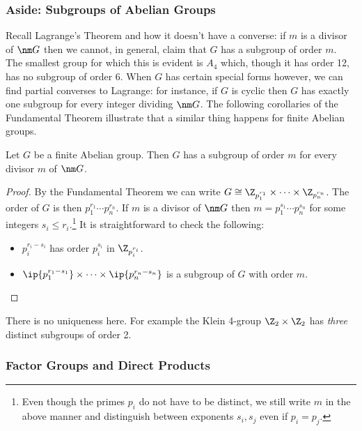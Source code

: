 
\begin{aside}
\vspace{-13pt}
\subsubsection*{Aside: Subgroups of Abelian Groups}

Recall Lagrange's Theorem and how it doesn't have a converse: if $m$ is a divisor of $\nm G$ then we cannot, in general, claim that $G$ has a subgroup of order $m$. The smallest group for which this is evident is $A_4$ which, though it has order 12, has no subgroup of order 6. When $G$ has certain special forms however, we can find partial converses to Lagrange: for instance, if $G$ is cyclic then $G$ has exactly one subgroup for every integer dividing $\nm G$. The following corollaries of the Fundamental Theorem illustrate that a similar thing happens for finite Abelian groups.

\begin{cor}\label{thm:abelsub}
Let $G$ be a finite Abelian group. Then $G$ has a subgroup of order $m$ for every divisor $m$ of $\nm G$.
\end{cor}

\begin{proof}
By the Fundamental Theorem we can write $G\cong\Z_{p_1^{r_1}}\times\cdots\times\Z_{p_n^{r_n}}$. The order of $G$ is then $p_1^{r_1}\cdots p_n^{r_n}$. If $m$ is a divisor of $\nm G$ then $m=p_1^{s_1}\cdots p_n^{s_n}$ for some integers $s_i\le r_i$.\footnote{Even though the primes $p_i$ do not have to be distinct, we still write $m$ in the above manner and distinguish between exponents $s_i,s_j$ even if $p_i=p_j$.} It is straightforward to check the following:
\begin{itemize}
  \item $p_i^{r_i-s_i}$ has order $p_i^{s_i}$ in $\Z_{p_i^{r_i}}$.
  \item $\ip{p_1^{r_1-s_1}}\times\cdots\times\ip{p_n^{r_n-s_n}}$ is a subgroup of $G$ with order $m$.\qedhere
\end{itemize}
\end{proof}

There is no uniqueness here. For example the Klein 4-group $\Z_2\times\Z_2$ has \emph{three} distinct subgroups of order 2.
\end{aside}


\subsubsection*{Factor Groups and Direct Products}

